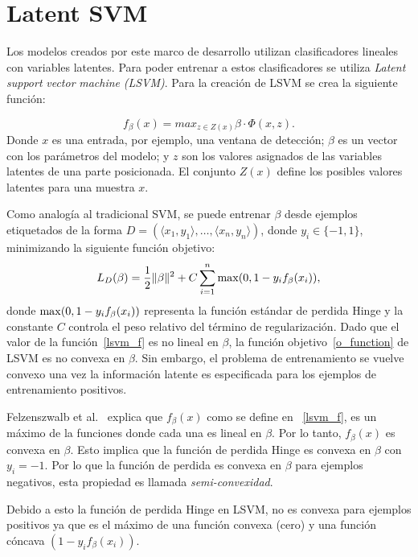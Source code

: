 \section{Latent SVM}\label{sec:lsvmIV}
Los modelos creados por este marco de desarrollo utilizan clasificadores lineales con variables latentes. Para poder entrenar a estos clasificadores se utiliza \textit{Latent} \textit{support} \textit{vector} \textit{machine} \textit{(LSVM)}. Para la creación de LSVM se crea la siguiente función:

\begin{equation}\label{lsvm_f}
f_{\beta}(x) = max_{z \in Z(x)} \beta \cdot \Phi (x, z).
\end{equation} 
Donde $x$ es una entrada, por ejemplo, una ventana de detección; $\beta$ es un vector con los parámetros del modelo; y $z$ son los valores asignados de las variables latentes de una parte posicionada. El conjunto $Z(x)$ define los posibles valores latentes para una muestra $x$.

Como analogía al tradicional SVM, se puede entrenar $\beta$ desde ejemplos etiquetados de la forma $D = (\langle x_1, y_1 \rangle, \dots, \langle x_n, y_n \rangle)$, donde $y_i \in \{-1, 1\}$, minimizando la siguiente función objetivo:
\begin{equation}\label{o_function}
L_D(\beta) = \frac{1}{2} \Vert \beta \Vert^2 + C \sum_{i=1}^n {\rm max} (0, 1-y_if_\beta (x_i)),
\end{equation}
donde ${\rm max} (0, 1-y_if_\beta(x_i))$ representa la función estándar de perdida Hinge y la constante $C$ controla el peso relativo del término de regularización. Dado que el valor de la función~\ref{lsvm_f} es no lineal en $\beta$, la función objetivo~\ref{o_function} de LSVM es no convexa en $\beta$. Sin embargo, el problema de entrenamiento se vuelve convexo una vez la información latente es especificada para los ejemplos de entrenamiento positivos.

Felzenszwalb et al.~\cite{Felzenszwalb2010} explica que $f_{\beta}(x)$ como se define en ~\ref{lsvm_f}, es un máximo de la funciones donde cada una es lineal en $\beta$. Por lo tanto, $f_{\beta}(x)$ es convexa en $\beta$. Esto implica que la función de perdida Hinge es convexa en $\beta$ con $y_i = -1$. Por lo que la función de perdida es convexa en $\beta$ para ejemplos negativos, esta propiedad es llamada \textit{semi-convexidad}.

Debido a esto la función de perdida Hinge en LSVM, no es convexa para ejemplos positivos ya que es el máximo de una función convexa (cero) y una función cóncava $(1-y_if_{\beta}(x_i))$.

